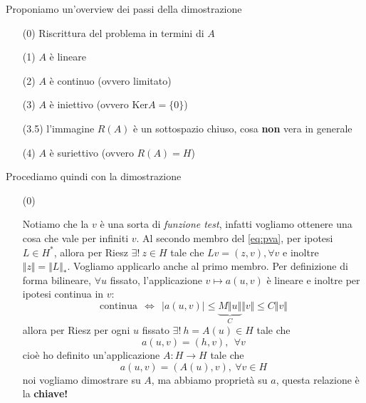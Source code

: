 \documentclass[10pt,a4paper,twoside,openright]{book}
\begin{document}
\begin{dimostrazione}
    Proponiamo un'overview dei passi della dimostrazione
    \begin{enumerate}
        \item[(0)] Riscrittura del problema in termini di $A$
        \item[(1)] $A$ è lineare
        \item[(2)] $A$ è continuo (ovvero limitato)
        \item[(3)] $A$ è iniettivo (ovvero $\mathrm{Ker} A=\{0\}$)
        \item[(3.5)] l'immagine $R(A)$ è un sottospazio chiuso, cosa \textbf{non} vera in generale
        \item[(4)] $A$ è suriettivo (ovvero $R(A) =H$)
    \end{enumerate}
    Procediamo quindi con la dimostrazione
    \begin{itemize}
        \item[(0)]

              Notiamo che la $v$ è una sorta di \textit{funzione test}, infatti vogliamo ottenere una cosa che vale per infiniti $v$. Al secondo membro del \eqref{eq:pva}, per ipotesi $L\in H^{*}$, allora per Riesz $\exists !\ z\in H$ tale che $Lv=(z,v),\forall v$ e inoltre $\Vert z\Vert =\Vert L\Vert _{*}$. Vogliamo applicarlo anche al primo membro. Per definizione di forma bilineare, $\forall u$ fissato, l'applicazione $v\mapsto a(u,v)$ è lineare e inoltre per ipotesi continua in $v$:
              \begin{equation*}
                  \text{continua} \ \ \Leftrightarrow \ \ | a(u,v)| \leqslant \underbrace{M\Vert u\Vert }_{C}\Vert v\Vert \leqslant C\Vert v\Vert
              \end{equation*}
              allora per Riesz per ogni $u$ fissato $\exists !\ h=A(u) \in H$ tale che
              \begin{equation*}
                  a(u,v) =(h,v),\ \ \forall v
              \end{equation*}
              cioè ho definito un'applicazione $A:H\rightarrow H$ tale che
              \begin{equation*}
                  \boxed{a(u,v) =(A(u),v),\ \forall v\in H}
              \end{equation*}
              noi vogliamo dimostrare su $A$, ma abbiamo proprietà su $a$, questa relazione è la \textbf{chiave!}


\end{itemize}
\end{dimostrazione}
\end{document}
